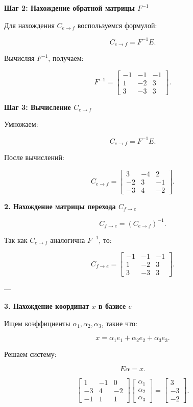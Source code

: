 \textbf{Шаг 2: Нахождение обратной матрицы \( F^{-1} \)}  

Для нахождения \( C_{e \to f} \) воспользуемся формулой:

\[
C_{e \to f} = F^{-1} E.
\]

Вычисляя \( F^{-1} \), получаем:

\[
F^{-1} =
\begin{bmatrix} 
-1 & -1 & -1 \\ 
1 & -2 & 3 \\ 
3 & -3 & 3
\end{bmatrix}.
\]

\textbf{Шаг 3: Вычисление \( C_{e \to f} \)}  

Умножаем:

\[
C_{e \to f} = F^{-1} E.
\]

После вычислений:

\[
C_{e \to f} = 
\begin{bmatrix} 
3 & -4 & 2 \\ 
-2 & 3 & -1 \\ 
-3 & 4 & -2
\end{bmatrix}.
\]

\textbf{2. Нахождение матрицы перехода \( C_{f \to e} \)}

\[
C_{f \to e} = (C_{e \to f})^{-1}.
\]

Так как \( C_{e \to f} \) аналогична \( F^{-1} \), то:

\[
C_{f \to e} = 
\begin{bmatrix} 
-1 & -1 & -1 \\ 
1 & -2 & 3 \\ 
3 & -3 & 3
\end{bmatrix}.
\]

---

\textbf{3. Нахождение координат \( x \) в базисе \( e \)}

Ищем коэффициенты \( \alpha_1, \alpha_2, \alpha_3 \), такие что:

\[
x = \alpha_1 e_1 + \alpha_2 e_2 + \alpha_3 e_3.
\]

Решаем систему:

\[
E \alpha = x.
\]

\[
\begin{bmatrix} 
1 & -1 & 0 \\ 
-3 & 4 & -2 \\ 
-1 & 1 & 1
\end{bmatrix}
\begin{bmatrix} \alpha_1 \\ \alpha_2 \\ \alpha_3 \end{bmatrix}
=
\begin{bmatrix} 3 \\ -3 \\ -2 \end{bmatrix}.
\]

